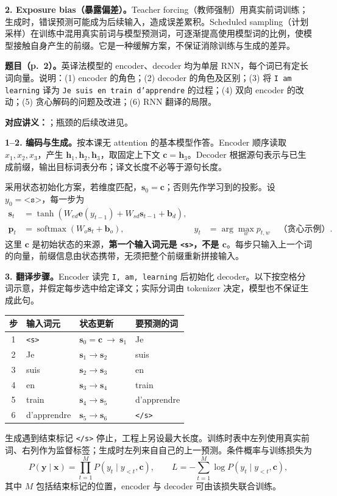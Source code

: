 \textbf{2. Exposure bias（暴露偏差）。}Teacher forcing（教师强制）用真实前词训练；生成时，错误预测可能成为后续输入，造成误差累积。Scheduled sampling（计划采样）在训练中混用真实前词与模型预测词，可逐渐提高使用模型词的比例，使模型接触自身产生的前缀。它是一种缓解方案，不保证消除训练与生成的差异。

\nopagebreak[4]
\textbf{题目（p.~2）。}英译法模型的 encoder、decoder 均为单层 RNN，每个词已有定长词向量。说明：(1) encoder 的角色；(2) decoder 的角色及区别；(3) 将 \texttt{I am learning} 译为 \texttt{Je suis en train d'apprendre} 的过程；(4) 双向 encoder 的改动；(5) 贪心解码的问题及改进；(6) RNN 翻译的局限。

\textbf{对应讲义：}；瓶颈的后续改进见。

\textbf{1--2. 编码与生成。}按本课无 attention 的基本模型作答。Encoder 顺序读取 $x_1,x_2,x_3$，产生 $\mathbf h_1,\mathbf h_2,\mathbf h_3$，取固定上下文 $\mathbf c=\mathbf h_3$。Decoder 根据源句表示与已生成前缀，输出目标词表分布；译文长度不必等于源句长度。

采用状态初始化方案，若维度匹配，$\mathbf s_0=\mathbf c$；否则先作学习到的投影。设 $y_0=\texttt{<s>}$，每一步为
\begin{align*}
 \mathbf s_t&=\tanh(W_{ed}\mathbf e(y_{t-1})+W_{sd}\mathbf s_{t-1}+\mathbf b_d),\\
 \mathbf p_t&=\operatorname{softmax}(W_o\mathbf s_t+\mathbf b_o),
 &\widehat y_t&=\arg\max_w p_{t,w}\quad\text{（贪心示例）}.
\end{align*}
这里 $\mathbf c$ 是初始状态的来源，\textbf{第一个输入词元是 \texttt{<s>}，不是 $\mathbf c$}。每步只输入上一个词的向量，前缀信息由状态携带，无须把整个前缀重新拼接输入。

\textbf{3. 翻译步骤。}Encoder 读完 \texttt{I, am, learning} 后初始化 decoder。以下按空格分词示意，并假定每步选中给定译文；实际分词由 tokenizer 决定，模型也不保证生成此句。
\begin{center}
\small
\begin{tabular}{@{}clll@{}}
\toprule
步 & 输入词元 & 状态更新 & 要预测的词 \\
\midrule
1 & \texttt{<s>} & $\mathbf s_0=\mathbf c\ \to\ \mathbf s_1$ & Je \\
2 & Je & $\mathbf s_1\to\mathbf s_2$ & suis \\
3 & suis & $\mathbf s_2\to\mathbf s_3$ & en \\
4 & en & $\mathbf s_3\to\mathbf s_4$ & train \\
5 & train & $\mathbf s_4\to\mathbf s_5$ & d'apprendre \\
6 & d'apprendre & $\mathbf s_5\to\mathbf s_6$ & \texttt{</s>} \\
\bottomrule
\end{tabular}
\end{center}
生成遇到结束标记 \texttt{</s>} 停止，工程上另设最大长度。训练时表中左列使用真实前词、右列作为监督标签；生成时左列来自自己的上一预测。条件概率与训练损失为
\[
 P(\mathbf y\mid\mathbf x)=\prod_{t=1}^{M}P(y_t\mid y_{<t},\mathbf c),
 \qquad L=-\sum_{t=1}^{M}\log P(y_t\mid y_{<t},\mathbf c),
\]
其中 $M$ 包括结束标记的位置，encoder 与 decoder 可由该损失联合训练。

